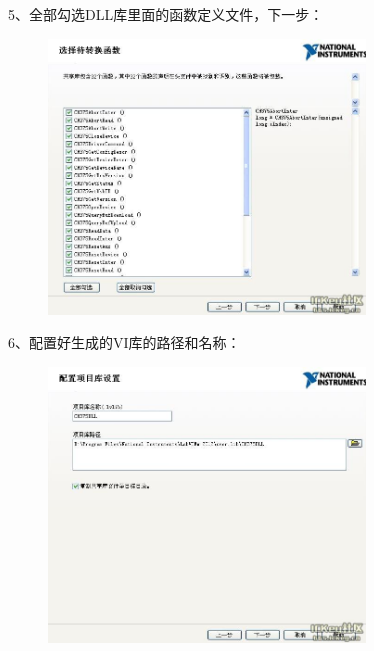 5、全部勾选DLL库里面的函数定义文件，下一步：
\begin{figure}[h!]
\centering
\includegraphics[width=0.75\textwidth]{pictures/5.jpg}
\end{figure}

 6、配置好生成的VI库的路径和名称：
\begin{figure}[h!]
\centering
\includegraphics[width=0.75\textwidth]{pictures/6.jpg}
\end{figure}

